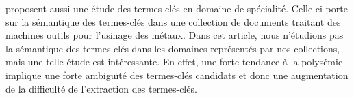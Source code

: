    proposent aussi une étude des
  termes-clés en domaine de spécialité. Celle-ci porte sur la sémantique des
  termes-clés dans une collection de documents traitant des machines outils pour
  l'usinage des métaux. Dans cet article, nous n'étudions pas la sémantique des
  termes-clés dans les domaines représentés par nos collections, mais une telle
  étude est intéressante. En effet, une forte tendance à la polysémie implique
  une forte ambiguïté des termes-clés candidats et donc une augmentation de la
  difficulté de l'extraction des termes-clés.

